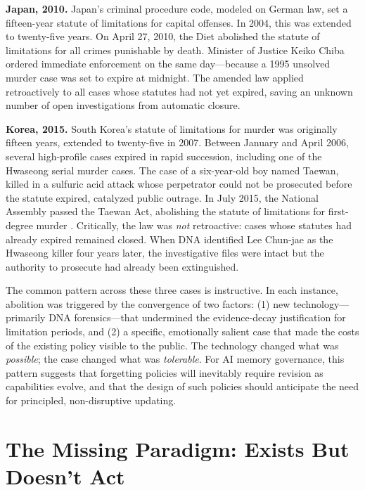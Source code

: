 \documentclass[12pt]{article}
\begin{document}
\textbf{Japan, 2010.} Japan's criminal procedure code, modeled on German law, set a fifteen-year statute of limitations for capital offenses. In 2004, this was extended to twenty-five years. On April 27, 2010, the Diet abolished the statute of limitations for all crimes punishable by death. Minister of Justice Keiko Chiba ordered immediate enforcement on the same day---because a 1995 unsolved murder case was set to expire at midnight. The amended law applied retroactively to all cases whose statutes had not yet expired, saving an unknown number of open investigations from automatic closure.

\textbf{Korea, 2015.} South Korea's statute of limitations for murder was originally fifteen years, extended to twenty-five in 2007. Between January and April 2006, several high-profile cases expired in rapid succession, including one of the Hwaseong serial murder cases. The case of a six-year-old boy named Taewan, killed in a sulfuric acid attack whose perpetrator could not be prosecuted before the statute expired, catalyzed public outrage. In July 2015, the National Assembly passed the Taewan Act, abolishing the statute of limitations for first-degree murder \citep{korea-taewan}. Critically, the law was \emph{not} retroactive: cases whose statutes had already expired remained closed. When DNA identified Lee Chun-jae as the Hwaseong killer four years later, the investigative files were intact but the authority to prosecute had already been extinguished.

The common pattern across these three cases is instructive. In each instance, abolition was triggered by the convergence of two factors: (1) new technology---primarily DNA forensics---that undermined the evidence-decay justification for limitation periods, and (2) a specific, emotionally salient case that made the costs of the existing policy visible to the public. The technology changed what was \emph{possible}; the case changed what was \emph{tolerable}. For AI memory governance, this pattern suggests that forgetting policies will inevitably require revision as capabilities evolve, and that the design of such policies should anticipate the need for principled, non-disruptive updating.

\section{The Missing Paradigm: Exists But Doesn't Act}
\label{sec:missing-paradigm}
\end{document}
